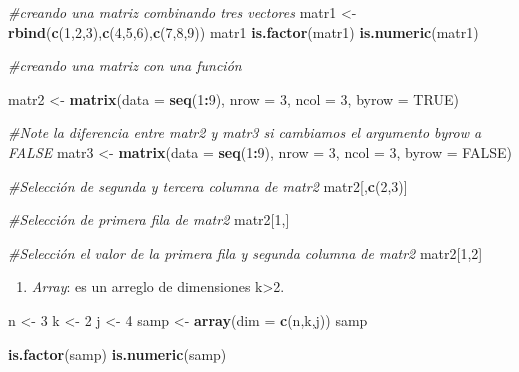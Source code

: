 \documentclass[]{article}
\newenvironment{Shaded}{\begin{snugshade}}{\end{snugshade}}
\newcommand{\CommentTok}[1]{\textcolor[rgb]{0.56,0.35,0.01}{\textit{#1}}}
\newcommand{\DataTypeTok}[1]{\textcolor[rgb]{0.13,0.29,0.53}{#1}}
\newcommand{\DecValTok}[1]{\textcolor[rgb]{0.00,0.00,0.81}{#1}}
\newcommand{\KeywordTok}[1]{\textcolor[rgb]{0.13,0.29,0.53}{\textbf{#1}}}
\newcommand{\NormalTok}[1]{#1}
\newcommand{\OperatorTok}[1]{\textcolor[rgb]{0.81,0.36,0.00}{\textbf{#1}}}
\newcommand{\OtherTok}[1]{\textcolor[rgb]{0.56,0.35,0.01}{#1}}
\newcommand{\StringTok}[1]{\textcolor[rgb]{0.31,0.60,0.02}{#1}}
\providecommand{\tightlist}{%
  \setlength{\itemsep}{0pt}\setlength{\parskip}{0pt}}
\begin{document}
\begin{Shaded}
\begin{Highlighting}[]
\CommentTok{#creando una matriz combinando tres vectores}
\NormalTok{matr1 <-}\StringTok{ }\KeywordTok{rbind}\NormalTok{(}\KeywordTok{c}\NormalTok{(}\DecValTok{1}\NormalTok{,}\DecValTok{2}\NormalTok{,}\DecValTok{3}\NormalTok{),}\KeywordTok{c}\NormalTok{(}\DecValTok{4}\NormalTok{,}\DecValTok{5}\NormalTok{,}\DecValTok{6}\NormalTok{),}\KeywordTok{c}\NormalTok{(}\DecValTok{7}\NormalTok{,}\DecValTok{8}\NormalTok{,}\DecValTok{9}\NormalTok{))}
\NormalTok{matr1}
\KeywordTok{is.factor}\NormalTok{(matr1)}
\KeywordTok{is.numeric}\NormalTok{(matr1)}

\CommentTok{#creando una matriz con una función}

\NormalTok{matr2 <-}\StringTok{ }\KeywordTok{matrix}\NormalTok{(}\DataTypeTok{data =} \KeywordTok{seq}\NormalTok{(}\DecValTok{1}\OperatorTok{:}\DecValTok{9}\NormalTok{), }\DataTypeTok{nrow =} \DecValTok{3}\NormalTok{, }\DataTypeTok{ncol =} \DecValTok{3}\NormalTok{, }\DataTypeTok{byrow =} \OtherTok{TRUE}\NormalTok{)}

\CommentTok{#Note la diferencia entre matr2 y matr3 si cambiamos el argumento byrow a FALSE}
\NormalTok{matr3 <-}\StringTok{ }\KeywordTok{matrix}\NormalTok{(}\DataTypeTok{data =} \KeywordTok{seq}\NormalTok{(}\DecValTok{1}\OperatorTok{:}\DecValTok{9}\NormalTok{), }\DataTypeTok{nrow =} \DecValTok{3}\NormalTok{, }\DataTypeTok{ncol =} \DecValTok{3}\NormalTok{, }\DataTypeTok{byrow =} \OtherTok{FALSE}\NormalTok{)}

\CommentTok{#Selección de segunda y tercera columna de matr2}
\NormalTok{matr2[,}\KeywordTok{c}\NormalTok{(}\DecValTok{2}\NormalTok{,}\DecValTok{3}\NormalTok{)]}

\CommentTok{#Selección de primera fila de matr2}
\NormalTok{matr2[}\DecValTok{1}\NormalTok{,]}

\CommentTok{#Selección el valor de la primera fila y segunda columna de matr2}
\NormalTok{matr2[}\DecValTok{1}\NormalTok{,}\DecValTok{2}\NormalTok{]}
\end{Highlighting}
\end{Shaded}

\begin{enumerate}
\def\labelenumi{\Alph{enumi})}
\setcounter{enumi}{2}
\tightlist
\item
  \emph{Array}: es un arreglo de dimensiones k\textgreater2.
\end{enumerate}

\begin{Shaded}
\begin{Highlighting}[]
\NormalTok{n <-}\StringTok{ }\DecValTok{3}
\NormalTok{k <-}\StringTok{ }\DecValTok{2}
\NormalTok{j <-}\StringTok{ }\DecValTok{4}
\NormalTok{samp <-}\StringTok{ }\KeywordTok{array}\NormalTok{(}\DataTypeTok{dim =} \KeywordTok{c}\NormalTok{(n,k,j))}
\NormalTok{samp}

\KeywordTok{is.factor}\NormalTok{(samp)}
\KeywordTok{is.numeric}\NormalTok{(samp)}
\end{Highlighting}
\end{Shaded}
\end{document}
